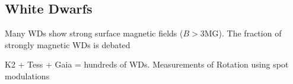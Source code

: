 {\color{red} \subsection{White Dwarfs}}
Many WDs show strong surface magnetic fields ($B>$3MG). The fraction of strongly magnetic WDs is debated 

K2 + Tess + Gaia = hundreds of WDs. Measurements of Rotation using spot modulations